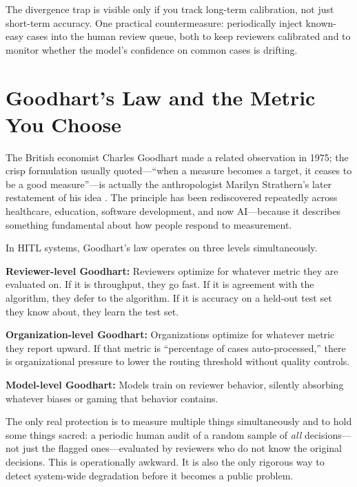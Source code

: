 \begin{cautionbox}
The divergence trap is visible only if you track long-term calibration, not just short-term accuracy. One practical countermeasure: periodically inject known-easy cases into the human review queue, both to keep reviewers calibrated and to monitor whether the model's confidence on common cases is drifting.
\end{cautionbox}

\section{Goodhart's Law and the Metric You Choose}

The British economist Charles Goodhart made a related observation in 1975; the crisp formulation usually quoted---``when a measure becomes a target, it ceases to be a good measure''---is actually the anthropologist Marilyn Strathern's later restatement of his idea \autocite{strathern1997improving}. The principle has been rediscovered repeatedly across healthcare, education, software development, and now AI---because it describes something fundamental about how people respond to measurement.

In HITL systems, Goodhart's law operates on three levels simultaneously.

\textbf{Reviewer-level Goodhart:} Reviewers optimize for whatever metric they are evaluated on. If it is throughput, they go fast. If it is agreement with the algorithm, they defer to the algorithm. If it is accuracy on a held-out test set they know about, they learn the test set.

\textbf{Organization-level Goodhart:} Organizations optimize for whatever metric they report upward. If that metric is ``percentage of cases auto-processed,'' there is organizational pressure to lower the routing threshold without quality controls.

\textbf{Model-level Goodhart:} Models train on reviewer behavior, silently absorbing whatever biases or gaming that behavior contains.

The only real protection is to measure multiple things simultaneously and to hold some things sacred: a periodic human audit of a random sample of \emph{all} decisions---not just the flagged ones---evaluated by reviewers who do not know the original decisions. This is operationally awkward. It is also the only rigorous way to detect system-wide degradation before it becomes a public problem.

